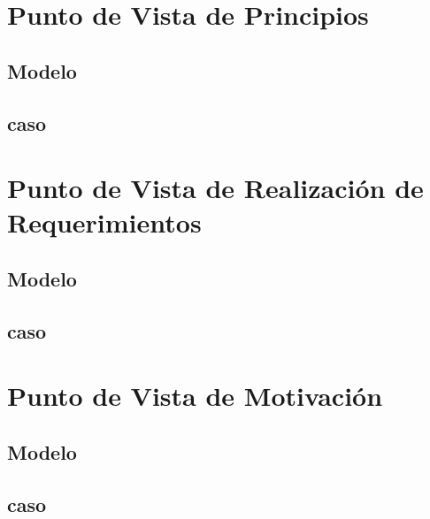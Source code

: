 \newpage

\section{Punto de Vista de Principios}

\subsection{Modelo}

\newpage

\subsection{caso}

\newpage

\section{Punto de Vista de Realización de Requerimientos}

\subsection{Modelo}

\newpage

\subsection{caso}

\newpage

\section{Punto de Vista de Motivación}

\subsection{Modelo}

\newpage

\subsection{caso}

\newpage

